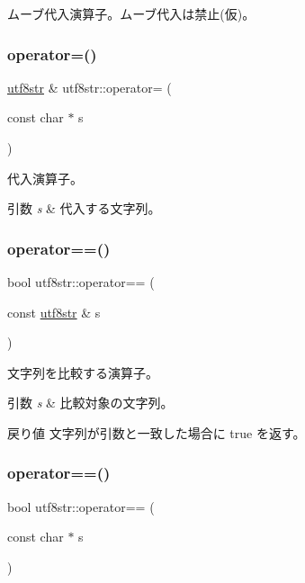 ムーブ代入演算子。ムーブ代入は禁止(仮)。 \hypertarget{classutf8str_a5b70a20e4f7e0bda0a0715aed51db540}{}\label{classutf8str_a5b70a20e4f7e0bda0a0715aed51db540} 
\subsubsection{\texorpdfstring{operator=()}{operator=()}\hspace{0.1cm}{\footnotesize\ttfamily [3/3]}}
{\footnotesize\ttfamily \hyperlink{classutf8str}{utf8str} \& utf8str\+::operator= (\begin{DoxyParamCaption}\item[{const char $\ast$}]{s }\end{DoxyParamCaption})}

代入演算子。 
\begin{DoxyParams}{引数}
{\em s} & 代入する文字列。 \\
\hline
\end{DoxyParams}
\hypertarget{classutf8str_a1e48c81428d5876e2072095efb51573b}{}\label{classutf8str_a1e48c81428d5876e2072095efb51573b} 
\subsubsection{\texorpdfstring{operator==()}{operator==()}\hspace{0.1cm}{\footnotesize\ttfamily [1/2]}}
{\footnotesize\ttfamily bool utf8str\+::operator== (\begin{DoxyParamCaption}\item[{const \hyperlink{classutf8str}{utf8str} \&}]{s }\end{DoxyParamCaption})}

文字列を比較する演算子。 
\begin{DoxyParams}{引数}
{\em s} & 比較対象の文字列。 \\
\hline
\end{DoxyParams}
\begin{DoxyReturn}{戻り値}
文字列が引数と一致した場合に true を返す。 
\end{DoxyReturn}
\hypertarget{classutf8str_a166f6a37d29e7e301240bfee8b97473e}{}\label{classutf8str_a166f6a37d29e7e301240bfee8b97473e} 
\subsubsection{\texorpdfstring{operator==()}{operator==()}\hspace{0.1cm}{\footnotesize\ttfamily [2/2]}}
{\footnotesize\ttfamily bool utf8str\+::operator== (\begin{DoxyParamCaption}\item[{const char $\ast$}]{s }\end{DoxyParamCaption})}

